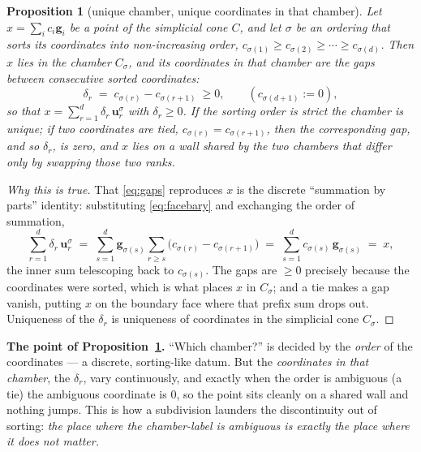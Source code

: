 \documentclass[11pt,a4paper]{article}
\theoremstyle{definition}
\theoremstyle{plain}
\newtheorem{proposition}[definition]{Proposition}
\newcommand{\bvec}[1]{\mathbf{#1}}
\begin{document}
\begin{proposition}[unique chamber, unique coordinates in that chamber]\label{prop:cell}
Let $x=\sum_i c_i\bvec g_i$ be a point of the simplicial cone $C$, and let
$\sigma$ be an ordering that sorts its coordinates into non-increasing order,
$c_{\sigma(1)}\ge c_{\sigma(2)}\ge\cdots\ge c_{\sigma(d)}$. Then $x$ lies in the
chamber $C_\sigma$, and its coordinates in that chamber are the \emph{gaps}
between consecutive sorted coordinates:
\begin{equation}\label{eq:gaps}
   \delta_r \;=\; c_{\sigma(r)}-c_{\sigma(r+1)}\ \ge 0,
   \qquad (c_{\sigma(d+1)}:=0),
\end{equation}
so that $x=\sum_{r=1}^d \delta_r\,\bvec u^\sigma_r$ with $\delta_r\ge0$. If the
sorting order is \emph{strict} the chamber is unique; if two coordinates are
tied, $c_{\sigma(r)}=c_{\sigma(r+1)}$, then the corresponding gap, and so
$\delta_r$, is \emph{zero}, and $x$ lies on a wall shared by the two chambers
that differ only by swapping those two ranks.
\end{proposition}

\begin{proof}[Why this is true]
That \eqref{eq:gaps} reproduces $x$ is the discrete ``summation by parts''
identity: substituting \eqref{eq:facebary} and exchanging the order of
summation,
\[
  \sum_{r=1}^{d} \delta_r\,\bvec u^\sigma_r
  \;=\; \sum_{s=1}^{d}\bvec g_{\sigma(s)}\!\!\sum_{r\ge s}
        \bigl(c_{\sigma(r)}-c_{\sigma(r+1)}\bigr)
  \;=\; \sum_{s=1}^{d} c_{\sigma(s)}\,\bvec g_{\sigma(s)} \;=\; x,
\]
the inner sum telescoping back to $c_{\sigma(s)}$. The gaps are $\ge0$
precisely because the coordinates were sorted, which is what places $x$ in
$C_\sigma$; and a tie makes a gap vanish, putting $x$ on the boundary face
where that prefix sum drops out. Uniqueness of the $\delta_r$ is uniqueness of
coordinates in the simplicial cone $C_\sigma$.
\end{proof}

\begin{tcolorbox}[ideabox]
\textbf{The point of Proposition~\ref{prop:cell}.} ``Which chamber?'' is decided by
the \emph{order} of the coordinates --- a discrete, sorting-like datum. But the
\emph{coordinates in that chamber}, the $\delta_r$, vary continuously, and
exactly when the order is ambiguous (a tie) the ambiguous coordinate is $0$, so
the point sits cleanly on a shared wall and nothing jumps. This is how a
subdivision launders the discontinuity out of sorting: \emph{the place where
the chamber-label is ambiguous is exactly the place where it does not matter.}
\end{tcolorbox}
\end{document}
